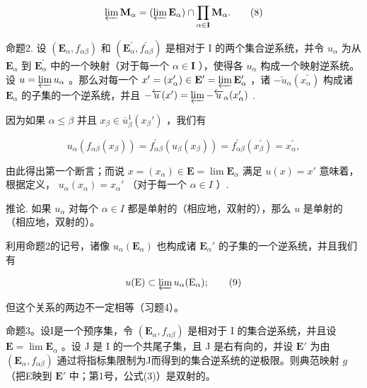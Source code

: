 \[
\varprojlim \mathbf {M} _ {\alpha} = (\varprojlim \mathbf {E} _ {\alpha}) \cap \prod_ {\alpha \in \mathbf {I}} \mathbf {M} _ {\alpha}.\tag{8}
\]

命题2. 设 \((\mathbf{E}_{\alpha}, f_{\alpha \beta})\) 和 \((\mathbf{E}_{\alpha}^{\prime}, f_{\alpha \beta}^{\prime})\) 是相对于 I 的两个集合逆系统，并令 \(u_{\alpha}\) 为从 \(\mathbf{E}_{\alpha}\) 到 \(\mathbf{E}_{\alpha}^{\prime}\) 中的一个映射（对于每一个 \(\alpha \in \mathbf{I}\) ），使得各 \(u_{\alpha}\) 构成一个映射逆系统。设 \(u = \varprojlim u_{\alpha}\) 。那么对每一个 \(x^{\prime} = (x_{\alpha}^{\prime}) \in \mathbf{E}^{\prime} = \varprojlim \mathbf{E}_{\alpha}^{\prime}\) ，诸 \(-\overleftarrow{u}_{\alpha}(x_{\alpha}^{\prime})\) 构成诸 \(\mathbf{E}_{\alpha}\) 的子集的一个逆系统，并且 \(-\overleftarrow{u}(x^{\prime}) = \varprojlim -\overleftarrow{u}_{\alpha}(x_{\alpha}^{\prime})\) .

因为如果 \(\alpha \leqslant \beta\) 并且 \(x_{\beta} \in \overline{u}_{\beta}^{1}(x_{\beta}')\) ，我们有

\[
u _ {\alpha} (f _ {\alpha \beta} (x _ {\beta})) = f _ {\alpha \beta} ^ {\prime} (u _ {\beta} (x _ {\beta})) = f _ {\alpha \beta} ^ {\prime} (x _ {\beta} ^ {\prime}) = x _ {\alpha} ^ {\prime},
\]

由此得出第一个断言；而说 \(x = (x_{\alpha}) \in \mathbf{E} = \lim \mathbf{E}_{\alpha}\) 满足 \(u(x) = x'\) 意味着，根据定义， \(u_{\alpha}(x_{\alpha}) = x_{\alpha}'\) （对于每一个 \(\alpha \in I\) ）.

推论. 如果 \(u_{\alpha}\) 对每个 \(\alpha \in I\) 都是单射的（相应地，双射的），那么 \(u\) 是单射的（相应地，双射的）。

利用命题2的记号，诸像 \(u_{\alpha}(\mathbf{E}_{\alpha})\) 也构成诸 \(\mathbf{E}_{\alpha}'\) 的子集的一个逆系统，并且我们有

\[
u (\mathrm{E}) \subset \varprojlim u _ {\alpha} (\mathrm{E} _ {\alpha});\tag{9}
\]

但这个关系的两边不一定相等（习题4）。

命题3。设I是一个预序集，令 \((\mathbf{E}_{\alpha}, f_{\alpha \beta})\) 是相对于 I 的集合逆系统，并且设 \(\mathbf{E} = \lim \mathbf{E}_{\alpha}\) 。设 J 是 I 的一个共尾子集，且 J 是右有向的，并设 \(\mathbf{E}'\) 为由 \((\mathbf{E}_{\alpha}, f_{\alpha \beta})\) 通过将指标集限制为J而得到的集合逆系统的逆极限。则典范映射 \(g\) （把E映到 \(\mathbf{E}'\) 中；第1号，公式(3)）是双射的。


